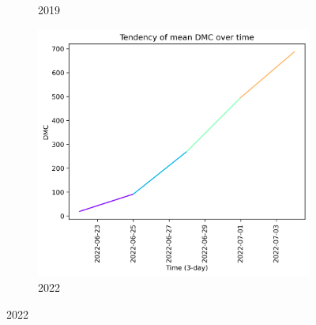 \begin{figure}[h]
\begin{subfigure}{0.3\textwidth}
        \caption{2019}
        \label{fig:dmc_prior_15_days_2019}
    \end{subfigure}
    \hfill
    \begin{subfigure}{0.3\textwidth}
        \centering
        \includegraphics[width=\textwidth]{graphs/2022/tendency/2022_tendency_graph_DMC.png}
        \caption{2022}
        \label{fig:dmc_prior_15_days_2022}
    \end{subfigure}
    
    \label{fig:dmc_values_15days_prior}
\end{figure}


